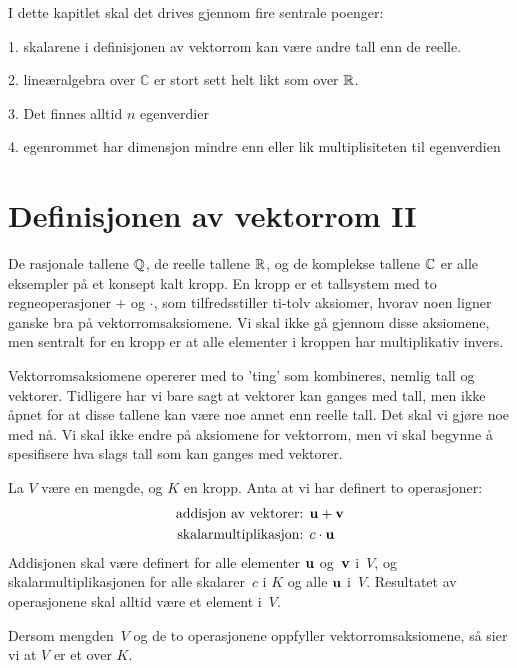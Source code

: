 

\label{ch:kompleks-linear-algebra}

I dette kapitlet skal det drives gjennom fire sentrale poenger: 

1. skalarene i definisjonen av vektorrom kan være andre tall enn de reelle.

2. lineæralgebra over $\mathbb C$ er stort sett helt likt som over $\mathbb{R}$.

3. Det finnes alltid $n$ egenverdier

4. egenrommet har dimensjon mindre enn eller lik multiplisiteten til egenverdien

\section*{Definisjonen av vektorrom II}

De rasjonale tallene $\mathbb{Q}$, de reelle tallene $\mathbb{R}$, og de komplekse tallene $\mathbb{C}$ er alle eksempler på et konsept kalt kropp. En kropp er et tallsystem med to regneoperasjoner $+$ og $\cdot$, som tilfredsstiller ti-tolv aksiomer, hvorav noen ligner ganske bra på vektorromsaksiomene. Vi skal ikke gå gjennom disse aksiomene, men sentralt for en kropp er at alle elementer i kroppen har multiplikativ invers.

Vektorromsaksiomene opererer med to 'ting' som kombineres, nemlig tall og vektorer. Tidligere har vi bare sagt at vektorer kan ganges med tall, men ikke åpnet for at disse tallene kan være noe annet enn reelle tall. Det skal vi gjøre noe med nå. Vi skal ikke endre på aksiomene for vektorrom, men vi skal begynne å spesifisere hva slags tall som kan ganges med vektorer. 

\begin{defn}
La $V$ være en mengde, og $K$ en kropp. Anta at vi har definert to operasjoner:
\begin{align*}
\text{addisjon av vektorer: } & \mathbf{u} + \mathbf{v} \\
\text{skalarmultiplikasjon: } & c \cdot \mathbf{u}
\end{align*}
Addisjonen skal være definert for alle elementer $\mathbf{u}$ og~$\mathbf{v}$
i~$V$, og skalarmultiplikasjonen for alle skalarer~$c$ i $K$ og alle $\mathbf{u}$
i~$V$.  Resultatet av operasjonene skal alltid være et element i~$V$.

Dersom mengden~$V$ og de to operasjonene oppfyller vektorromsaksiomene, 
så sier vi at $V$ er et  over $K$.
\end{defn}

